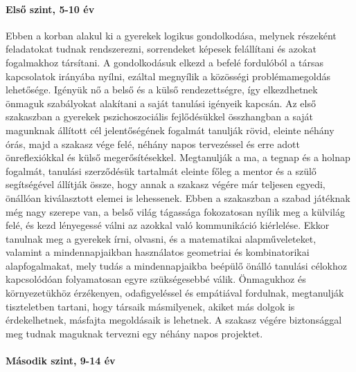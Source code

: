 \paragraph{Első szint, 5-10 év }

Ebben a korban alakul ki a gyerekek logikus gondolkodása, melynek részeként
feladatokat tudnak rendszerezni, sorrendeket képesek felállítani és azokat
fogalmakhoz társítani. A gondolkodásuk elkezd a befelé fordulóból a társas
kapcsolatok irányába nyílni, ezáltal megnyílik a közösségi problémamegoldás
lehetősége. Igényük nő a belső és a külső rendezettségre, így elkezdhetnek
önmaguk szabályokat alakítani a saját tanulási igényeik kapcsán.
Az első szakaszban a gyerekek pszichoszociális fejlődésükkel összhangban a
saját magunknak állított cél jelentőségének fogalmát tanulják rövid, eleinte
néhány órás, majd a szakasz vége felé, néhány napos tervezéssel és erre adott
önreflexiókkal és külső megerősítésekkel. Megtanulják a ma, a tegnap és a
holnap fogalmát, tanulási szerződésük tartalmát eleinte főleg a mentor és a
szülő segítségével állítják össze, hogy annak a szakasz végére már teljesen
egyedi, önállóan kiválasztott elemei is lehessenek.
Ebben a szakaszban a szabad játéknak még nagy szerepe van, a belső világ
tágassága fokozatosan nyílik meg a külvilág felé, és kezd lényegessé válni az
azokkal való kommunikáció kiérlelése.
Ekkor tanulnak meg a gyerekek írni, olvasni, és a matematikai alapműveleteket,
valamint a mindennapjaikban használatos  geometriai és kombinatorikai
alapfogalmakat, mely tudás a mindennapjaikba beépülő önálló tanulási célokhoz
kapcsolódóan folyamatosan egyre szükségesebbé válik. Önmagukhoz és
környezetükhöz érzékenyen, odafigyeléssel és empátiával fordulnak, megtanulják
tiszteletben tartani, hogy társaik másmilyenek, akiket más dolgok is
érdekelhetnek, másfajta megoldásaik is lehetnek.
A szakasz végére biztonsággal meg tudnak maguknak tervezni egy néhány napos
projektet.

\paragraph{Második szint, 9-14 év}

